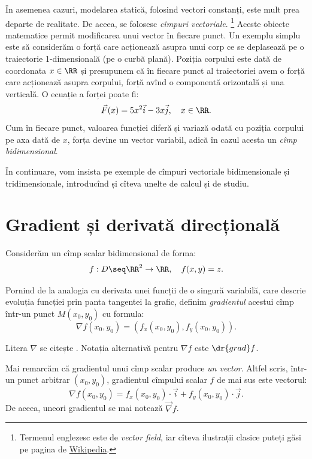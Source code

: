 În asemenea cazuri, modelarea statică, folosind vectori constanți, este mult
prea departe de realitate. De aceea, se folosesc \emph{cîmpuri vectoriale}.
\footnote{Termenul englezesc este de \emph{vector field}, iar cîteva
  ilustrații clasice puteți găsi pe pagina de
  \href{https://en.wikipedia.org/wiki/Vector\_field}{Wikipedia}.}
Aceste obiecte matematice permit modificarea unui vector în fiecare punct.
Un exemplu simplu este să considerăm o forță care acționează asupra unui
corp ce se deplasează pe o traiectorie 1-dimensională (pe o curbă plană). Poziția
corpului este dată de coordonata $ x \in \RR $ și presupunem că în fiecare
punct al traiectoriei avem o forță care acționează asupra corpului, forță
avînd o componentă orizontală și una verticală. O ecuație a forței poate fi\footnotemark:
\[
  \vec{F}(x) = 5x^2 \vec{i} - 3x \vec{j}, \quad x \in \RR.
\]
Cum în fiecare punct, valoarea funcției diferă și variază odată cu poziția
corpului pe axa dată de $ x $, forța devine un vector variabil, adică
în cazul acesta un \emph{cîmp bidimensional}.


\vspace{1cm}

În continuare, vom insista pe exemple de cîmpuri vectoriale bidimensionale
și tridimensionale, introducînd și cîteva unelte de calcul și de studiu.


\section{Gradient și derivată direcțională}

Considerăm un cîmp scalar bidimensional de forma:
\[
  f : D \seq \RR^2 \to \RR, \quad f(x, y) = z.
\]

  
Pornind de la analogia cu derivata unei funcții de o singură variabilă,
care descrie evoluția funcției prin panta tangentei la grafic, definim
\emph{gradientul} acestui cîmp într-un punct $ M(x_0, y_0) $ cu formula:
\[
  \nabla f(x_0, y_0) = (f_x(x_0, y_0), f_y(x_0, y_0)).
\]

\begin{remark}\label{rk:grad}
  Litera $ \nabla $ se citește . Notația alternativă pentru
  $ \nabla f $ este $ \dr{grad} f $.

  Mai remarcăm că gradientul unui cîmp scalar produce \emph{un vector}.
  Altfel scris, într-un punct arbitrar $ (x_0, y_0) $, gradientul
  cîmpului scalar $ f $ de mai sus este vectorul:
  \[
    \nabla f(x_0, y_0) = f_x(x_0, y_0) \cdot \vec{i} + f_y(x_0, y_0) \cdot \vec{j}.
  \]
  De aceea, uneori gradientul se mai notează $ \vec{\nabla} f $.
 
\end{remark}

